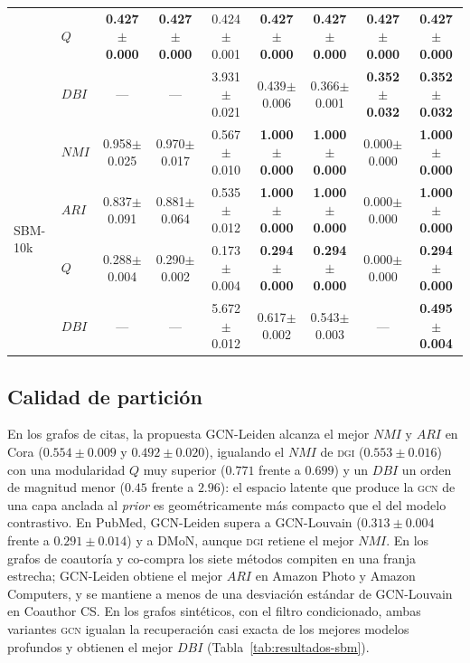 \documentclass[twoside,twocolumn,10pt]{article}
\begin{document}
\begin{table}[t]
{\begin{tabular}{@{}llccccccc@{}}
 & $Q$ & \textbf{0.427{\scriptsize$\pm$0.000}} & \textbf{0.427{\scriptsize$\pm$0.000}} & 0.424{\scriptsize$\pm$0.001} & \textbf{0.427{\scriptsize$\pm$0.000}} & \textbf{0.427{\scriptsize$\pm$0.000}} & \textbf{0.427{\scriptsize$\pm$0.000}} & \textbf{0.427{\scriptsize$\pm$0.000}} \\
 & $DBI$ & --- & --- & 3.931{\scriptsize$\pm$0.021} & 0.439{\scriptsize$\pm$0.006} & 0.366{\scriptsize$\pm$0.001} & \textbf{0.352{\scriptsize$\pm$0.032}} & \textbf{0.352{\scriptsize$\pm$0.032}} \\
\midrule
\multirow{4}{*}{SBM-10k} & $NMI$ & 0.958{\scriptsize$\pm$0.025} & 0.970{\scriptsize$\pm$0.017} & 0.567{\scriptsize$\pm$0.010} & \textbf{1.000{\scriptsize$\pm$0.000}} & \textbf{1.000{\scriptsize$\pm$0.000}} & 0.000{\scriptsize$\pm$0.000} & \textbf{1.000{\scriptsize$\pm$0.000}} \\
 & $ARI$ & 0.837{\scriptsize$\pm$0.091} & 0.881{\scriptsize$\pm$0.064} & 0.535{\scriptsize$\pm$0.012} & \textbf{1.000{\scriptsize$\pm$0.000}} & \textbf{1.000{\scriptsize$\pm$0.000}} & 0.000{\scriptsize$\pm$0.000} & \textbf{1.000{\scriptsize$\pm$0.000}} \\
 & $Q$ & 0.288{\scriptsize$\pm$0.004} & 0.290{\scriptsize$\pm$0.002} & 0.173{\scriptsize$\pm$0.004} & \textbf{0.294{\scriptsize$\pm$0.000}} & \textbf{0.294{\scriptsize$\pm$0.000}} & 0.000{\scriptsize$\pm$0.000} & \textbf{0.294{\scriptsize$\pm$0.000}} \\
 & $DBI$ & --- & --- & 5.672{\scriptsize$\pm$0.012} & 0.617{\scriptsize$\pm$0.002} & 0.543{\scriptsize$\pm$0.003} & --- & \textbf{0.495{\scriptsize$\pm$0.004}} \\
\bottomrule
\end{tabular}}%
\end{table}

\subsection{Calidad de partición}
\label{subsec:analisis-calidad}

En los grafos de citas, la propuesta GCN-Leiden alcanza el mejor $NMI$ y $ARI$ en Cora ($0.554 \pm 0.009$ y $0.492 \pm 0.020$), igualando el $NMI$ de \textsc{dgi} ($0.553 \pm 0.016$) con una modularidad $Q$ muy superior ($0.771$ frente a $0.699$) y un $DBI$ un orden de magnitud menor ($0.45$ frente a $2.96$): el espacio latente que produce la \textsc{gcn} de una capa anclada al \textit{prior} es geométricamente más compacto que el del modelo contrastivo. En PubMed, GCN-Leiden supera a GCN-Louvain ($0.313 \pm 0.004$ frente a $0.291 \pm 0.014$) y a DMoN, aunque \textsc{dgi} retiene el mejor $NMI$. En los grafos de coautoría y co-compra los siete métodos compiten en una franja estrecha; GCN-Leiden obtiene el mejor $ARI$ en Amazon Photo y Amazon Computers, y se mantiene a menos de una desviación estándar de GCN-Louvain en Coauthor CS. En los grafos sintéticos, con el filtro condicionado, ambas variantes \textsc{gcn} igualan la recuperación casi exacta de los mejores modelos profundos y obtienen el mejor $DBI$ (Tabla~\ref{tab:resultados-sbm}).
\end{document}

